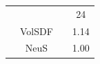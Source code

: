 \documentclass{article}
\begin{document}
\begin{table}
\begin{tabular}{@{}lccc}
\multicolumn{3}{c}{} & 24 \\
 & VolSDF & & 1.14 \\
 & NeuS & & 1.00 \\
\end{tabular}
\end{table}
\end{document}
